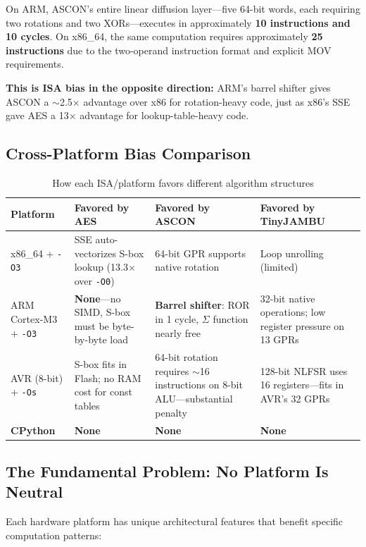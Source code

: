 \documentclass[11pt,a4paper]{article}
\begin{document}
On ARM, ASCON's entire linear diffusion layer---five 64-bit words, each requiring two rotations and two XORs---executes in approximately \textbf{10 instructions and 10 cycles}. On x86\_64, the same computation requires approximately \textbf{25 instructions} due to the two-operand instruction format and explicit MOV requirements.

\textbf{This is ISA bias in the opposite direction:} ARM's barrel shifter gives ASCON a $\sim$2.5$\times$ advantage over x86 for rotation-heavy code, just as x86's SSE gave AES a 13$\times$ advantage for lookup-table-heavy code.

\subsection{Cross-Platform Bias Comparison}

\begin{table}[H]
\centering
\caption{How each ISA/platform favors different algorithm structures}
\label{tab:isa_bias}
\begin{tabular}{lp{4cm}p{4cm}p{3cm}}
\toprule
\textbf{Platform} & \textbf{Favored by AES} & \textbf{Favored by ASCON} & \textbf{Favored by TinyJAMBU} \\
\midrule
x86\_64 + {\tt -O3} & SSE auto-vectorizes S-box lookup (13.3$\times$ over {\tt -O0}) & 64-bit GPR supports native rotation & Loop unrolling (limited) \\
\midrule
ARM Cortex-M3 + {\tt -O3} & \textbf{None}---no SIMD, S-box must be byte-by-byte load & \textbf{Barrel shifter}: ROR in 1 cycle, $\Sigma$ function nearly free & 32-bit native operations; low register pressure on 13 GPRs \\
\midrule
AVR (8-bit) + {\tt -Os} & S-box fits in Flash; no RAM cost for const tables & 64-bit rotation requires $\sim$16 instructions on 8-bit ALU---substantial penalty & 128-bit NLFSR uses 16 registers---fits in AVR's 32 GPRs \\
\midrule
\textbf{CPython} & \textbf{None} & \textbf{None} & \textbf{None} \\
\bottomrule
\end{tabular}
\end{table}

\subsection{The Fundamental Problem: No Platform Is Neutral}

Each hardware platform has unique architectural features that benefit specific computation patterns:
\end{document}
